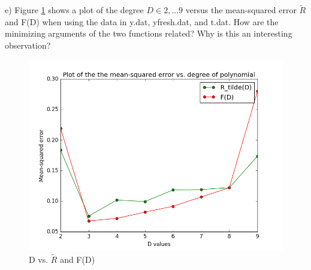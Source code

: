 \documentclass[11pt]{article}
\newenvironment{problem}[2][Problem]{\begin{trivlist}
\item[\hskip \labelsep {\bfseries #1}\hskip \labelsep {\bfseries #2.}]}{\end{trivlist}}
\begin{document}
\begin{problem}{2.1}
(e) Figure \ref{fig:2e} shows a plot of the degree $D \in {2,...9}$ versus the mean-squared error $\tilde{R}$ and F(D) when using the data in y.dat, yfresh.dat, and t.dat. {\color{red}How are the minimizing arguments of the two functions related?} {\color{red}Why is this an interesting observation?}
\begin{figure}[h!]
  \centering
  \includegraphics[scale=0.5]{figs/2e.png}
  \caption{D vs. $\tilde{R}$ and F(D)}
  \label{fig:2e}
\end{figure}

\end{problem}
 
\end{document}
